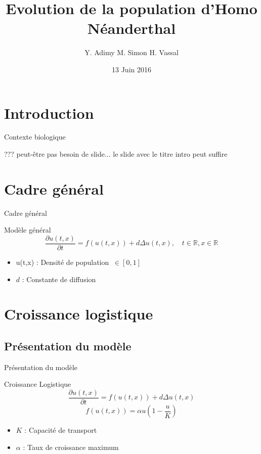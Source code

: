 \documentclass[10pt]{beamer}
\title[Population Néanderthal]{\textbf{Evolution de la population d'Homo Néanderthal}}
\author[Y. Adimy M. Simon H. Vassal]{Y. Adimy M. Simon H. Vassal}
\institute[]{INSA Lyon - Bioinformatique et Modélisation}
\date{13 Juin 2016}
\begin{document}

\begin{frame} 
   \titlepage
   \insertlogo
\end{frame}


\section{Introduction}
\begin{frame}{Contexte biologique}{}

???
peut-être pas besoin de slide... le slide avec le titre intro peut suffire 

\end{frame}

\section{Cadre général}
\begin{frame}{Cadre général}{}
\begin{block}{Modèle général}
	\begin{equation}
		\frac{\partial u(t,x)}{\partial t}=f(u(t,x))+d\Delta u(t,x), \quad t \in \mathbb{R}, x \in \mathbb{R}
	\end{equation}
\end{block}
\begin{itemize}
	\item u(t,x) : Densité de population  $\ \in[0,1]$ 
    \item $d$ : Constante de diffusion 
\end{itemize}
\end{frame}

\section{Croissance logistique}
\subsection{Présentation du modèle}
\begin{frame}{Présentation du modèle}{}
\begin{block}{Croissance Logistique}
	$$\frac{\partial u(t,x)}{\partial t}=f(u(t,x))+d\Delta u(t,x)$$
	$$f(u(t,x))=\alpha u (1 - \dfrac{u}{K}) $$
\end{block}
\begin{itemize}
    \item $K$ : Capacité de transport 
    \item $\alpha$ : Taux de croissance maximum
\end{itemize}
\end{frame}
\end{document}
